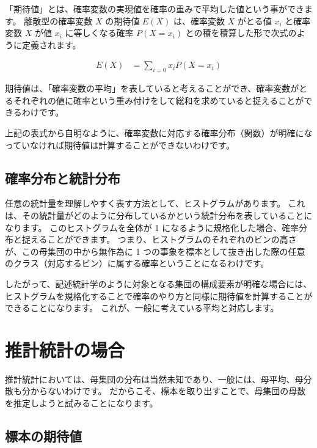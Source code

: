 \documentclass[uplatex,11pt,a4paper]{jsarticle}
\begin{document}
「期待値」とは、確率変数の実現値を確率の重みで平均した値という事ができます。
離散型の確率変数 $X$ の期待値 $E(X)$ は、確率変数 $X$ がとる値 $x_i$ と確率変数 $X$ が値 $x_i$ に等しくなる確率 $P(X=x_i)$ との積を積算した形で次式のように定義されます。

\begin{align*}
E(X) 
	&= \displaystyle \sum_{i=0} x_i P(X = x_i)
\end{align*}

期待値は、「確率変数の平均」を表していると考えることができ、確率変数がとるそれぞれの値に確率という重み付けをして総和を求めていると捉えることができるわけです。

\begin{boxnote}
上記の表式から自明なように、確率変数に対応する確率分布（関数）が明確になっていなければ期待値は計算することができないわけです。
\end{boxnote}

\subsection{確率分布と統計分布}

任意の統計量を理解しやすく表す方法として、ヒストグラムがあります。
これは、その統計量がどのように分布しているかという統計分布を表していることになります。
このヒストグラムを全体が 1 になるように規格化した場合、確率分布と捉えることができます。
つまり、ヒストグラムのそれぞれのビンの高さが、この母集団の中から無作為に 1 つの事象を標本として抜き出した際の任意のクラス（対応するビン）に属する確率ということになるわけです。

したがって、記述統計学のように対象となる集団の構成要素が明確な場合には、ヒストグラムを規格化することで確率のやり方と同様に期待値を計算することができることになります。
これが、一般に考えている平均と対応します。

\newpage

\section{推計統計の場合}

推計統計においては、母集団の分布は当然未知であり、一般には、母平均、母分散も分からないわけです。
だからこそ、標本を取り出すことで、母集団の母数を推定しようと試みることになります。

\subsection{標本の期待値}
\label{sec: EV_sample}
\end{document}
